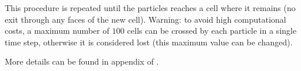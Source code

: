 This procedure is repeated until the particles reaches a cell where it remains (no exit through any faces of the new cell). Warning: to avoid high computational costs, a maximum number of $100$ cells can be crossed by each particle in a single time step, otherwise it is considered lost (this maximum value can be changed).

More details can be found in appendix of \cite{balvet2023time}.
